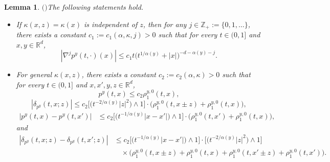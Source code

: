 \documentclass[a4paper,11pt]{amsart}
\renewcommand{\le}{\leqslant}
\newcommand{\R}{\mathds R}
\newcommand{\K}{\kappa}
\newcommand{\A}{\alpha}
\newtheorem{lemma}[theorem]{Lemma}
\theoremstyle{definition}
\begin{document}
\begin{lemma}$($\cite[Lemmas 2.2 and 2.3]{CZ}$)$\label{p1-1} The following statements hold.
\begin{itemize}
\item[(1)] If $\K(x,z) =\K (x)$ is independent of $z$, then for any $j \in \mathbb{Z}_+:=\{0,1,\ldots\}$, there exists a constant $c_1:=c_1(\A,\K, j)>0$ such that for every $t \in (0,1]$ and
$x,y\in \R^d$,
\begin{equation}\label{p1-1-1}
|\nabla^j p^y(t,\cdot)(x)|\le c_1t\big(t^{{1/\A(y)}}+|x|\big)^{-d-\A(y)-j}.
\end{equation}

\item[(2)] For general  $\K(x,z)$,
there exists a constant
$c_2:=c_2(\A,\K)>0$ such that for every $t \in (0,1]$ and $x,x',y,z \in \R^d$,
\begin{equation}\label{p1-1-1-1-0}
p^y(t,x)\le c_2 \rho_1^{y,0}(t,x),
\end{equation}
\begin{equation}\label{p1-1-2}
|\delta_{p^y}(t,x;z)|\le
c_2\big[\big(t^{-{2}/{\A(y)}}|z|^2\big)\wedge 1\big] \cdot
\big(\rho_1^{y,0}(t,x\pm z)+\rho_1^{y,0}(t,x)\big),
\end{equation}
\begin{equation}\label{p1-1-3}
\begin{split}
|p^y(t,x)-p^y(t,x')|&\le c_2\big[\big(t^{-{1/\A(y)}}|x-x'|\big)\wedge 1\big]
\cdot\big(\rho_1^{y,0}(t,x')+\rho_1^{y,0}(t,x)\big),
\end{split}
\end{equation} and
\begin{equation}\label{p1-1-4}
\begin{split}
|\delta_{p^y}(t,x;z)-\delta_{p^y}(t,x';z)|&
\le  c_2 \big[\big(t^{-{1/\A(y)}}|x-x'|\big)\wedge 1\big]
\cdot \big[\big(t^{-{2}/{\A(y)}}|z|^2\big)\wedge 1\big]\\
&\quad\times\big(\rho_1^{y,0}(t,x\pm z)+\rho_1^{y,0}(t,x)+\rho_1^{y,0}(t,x'\pm z)+\rho_1^{y,0}(t,x')\big).
\end{split}
\end{equation}
\end{itemize}
\end{lemma}
\end{document}
